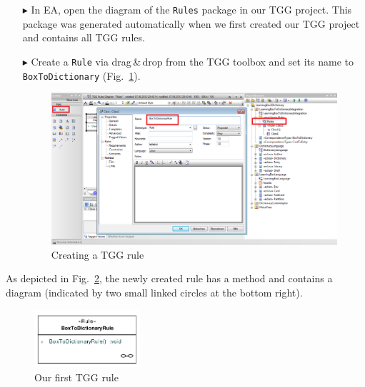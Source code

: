 \begin{enumerate}
\item[$\blacktriangleright$] In EA, open the diagram of the \texttt{Rules} package in our TGG project.
This package was generated automatically when we first created our TGG project and contains all TGG rules.

\item[$\blacktriangleright$] Create a \texttt{Rule} via drag\,\&\,drop from the TGG toolbox and set its name to \texttt{BoxToDictionary} (Fig.~\ref{fig:create_tgg_rule}).

\begin{figure}[htbp]
\begin{center}
  \includegraphics[width=\textwidth]{pics/tggBilder/tggRule/tgg8}
  \caption{Creating a TGG rule}  
  \label{fig:create_tgg_rule}
\end{center}
\end{figure}

\end{enumerate}

As depicted in Fig.~\ref{fig:first_tgg_rule}, the newly created rule has a method and contains a diagram (indicated by two small linked circles at the bottom right).

\begin{figure}[htbp]
\begin{center}
  \includegraphics[width=0.35\textwidth]{pics/tggBilder/tggRule/tgg9}
  \caption{Our first TGG rule}  
  \label{fig:first_tgg_rule}
\end{center}
\end{figure}

